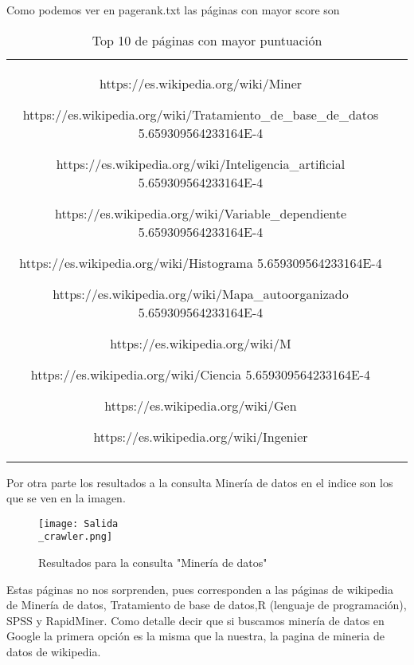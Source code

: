 \documentclass[palatino,nochap]{apuntes}
\begin{document}
Como podemos ver en pagerank.txt las páginas con mayor score son 

\begin{table}
\centering
\begin{tabular}{cc}
\item https://es.wikipedia.org/wiki/Miner%
\item https://es.wikipedia.org/wiki/Tratamiento\_de\_base\_de\_datos 5.659309564233164E-4
\item https://es.wikipedia.org/wiki/Inteligencia\_artificial 5.659309564233164E-4
\item https://es.wikipedia.org/wiki/Variable\_dependiente 5.659309564233164E-4
\item https://es.wikipedia.org/wiki/Histograma 5.659309564233164E-4
\item https://es.wikipedia.org/wiki/Mapa\_autoorganizado 5.659309564233164E-4
\item https://es.wikipedia.org/wiki/M%
\item https://es.wikipedia.org/wiki/Ciencia 5.659309564233164E-4
\item https://es.wikipedia.org/wiki/Gen%
\item https://es.wikipedia.org/wiki/Ingenier%
\end{tabular}
\caption{Top 10 de páginas con mayor puntuación}
\end{table}

Por otra parte los resultados a la consulta Minería de datos en el indice son los que se ven en la imagen.

\begin{figure}
\centering
\texttt{[image: Salida\\\_crawler.png]}
\caption{Resultados para la consulta "Minería de datos"}
\end{figure}

Estas páginas no nos sorprenden, pues corresponden a las páginas de wikipedia de Minería de datos, Tratamiento de base de datos,R (lenguaje de programación), SPSS y RapidMiner.
Como detalle decir que si buscamos minería de datos en Google la primera opción es la misma que la nuestra, la pagina de mineria de datos de wikipedia.
\end{document}
